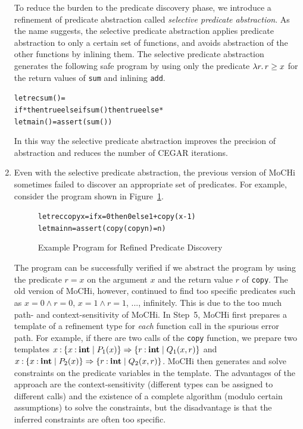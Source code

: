 \begin{enumerate}
      To reduce the burden to the predicate discovery phase, we introduce
      a refinement of predicate abstraction called \emph{selective
      predicate abstraction}.  As the name suggests, the selective
      predicate abstraction applies predicate abstraction to only a
      certain set of functions, and avoids abstraction of the other
      functions by inlining them.  The selective predicate abstraction
      generates the following safe program by using only the
      predicate $\lambda{r}.\,{r \geq x}$ for the return values of \texttt{sum}
      and inlining \texttt{add}.
\vspace{-5pt}
\begin{alltt}
 letrec sum () =
   if * then true else if sum() then true else *
 let main () = assert (sum ())
\end{alltt}
\vspace{-5pt}
      In this way the selective predicate abstraction improves the
      precision of abstraction and reduces the number of CEGAR iterations.

\item Even with the selective predicate abstraction, the previous
      version of MoCHi sometimes failed to discover an appropriate
      set of predicates. For example, consider the program
      shown in Figure~\ref{fig:copy}.
\begin{figure}[t]
\vspace{-5pt}
\begin{alltt}
 letrec copy x = if x=0 then 0 else 1 + copy (x-1)
 let main n = assert (copy (copy n) = n)
\end{alltt}
\vspace{-5pt}
\caption{Example Program for Refined Predicate Discovery}
\label{fig:copy}
\end{figure}
      The program can be successfully verified if we abstract the
      program by using the predicate \(r=x\) on the argument \(x\) and
      the return value \(r\) of \texttt{copy}.
     The old version of MoCHi, however, continued to find
      too specific predicates such as
      \(x=0\land r=0\), \(x=1\land r=1\), ...,
      infinitely.
      This is due to the too much path- and context-sensitivity of MoCHi.
      In Step~5, MoCHi first prepares a template of a refinement type
      for \emph{each} function call in the spurious error path.
     For example, if there are two calls of the \texttt{copy} function,
      we prepare two templates \(x\mathbin{:}\{{x\mathbin{:}\mathbf{int} \mid P_1(x)}\}\Rightarrow
       \{{r\mathbin{:}\mathbf{int} \mid Q_1(x,r)}\}\) and
    \(x\mathbin{:}\{{x\mathbin{:}\mathbf{int} \mid P_2(x)}\}\Rightarrow
       \{{r\mathbin{:}\mathbf{int} \mid Q_2(x,r)}\}\).
     MoCHi then generates and solve
      constraints on the predicate variables in the template.
     The advantages of the approach are the context-sensitivity (different
   types can be assigned to different calls) and the existence of
   a complete algorithm (modulo certain assumptions) to solve the constraints,
    but the disadvantage is that the inferred constraints are often too
    specific.


\end{enumerate}
